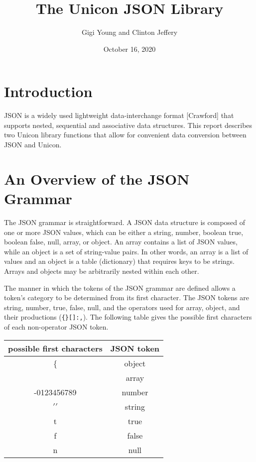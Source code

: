 \documentclass[letterpaper,12pt]{article}
\title{The Unicon JSON Library}
\author{Gigi Young and Clinton Jeffery}
\date{October 16, 2020}
\begin{document}
\maketitle

\section{Introduction}

JSON is a widely used lightweight data-interchange format [Crawford]
that supports nested, sequential and associative data structures.
This report describes two Unicon library
functions that allow for convenient data conversion
between JSON and Unicon.

\section{An Overview of the JSON Grammar}

The JSON grammar is straightforward. A JSON data structure is composed
of one or more JSON values, which can be either a string, number,
boolean true, boolean false, null, array, or object. An array contains
a list of JSON values, while an object is a set of string-value
pairs. In other words, an array is a list of values and an object is a
table (dictionary) that requires keys to be strings.
Arrays and objects may be arbitrarily nested within each other.

The manner in which the tokens of the JSON grammar are defined allows
a token's category to be determined from its first character. The JSON
tokens are string, number, true, false, null, and the operators used
for array, object, and their productions (\texttt{\{\}[]:,}). The
following table gives the possible first characters of each
non-operator JSON token.

\begin{center}
\begin{tabular}{ c | c }
 possible first characters  & JSON token \\
 \hline
 \{                         & object \\
 \verb [                    & array \\
 -0123456789                & number \\
 $\prime\prime$             & string \\
 t                          & true \\
 f                          & false \\
 n                          & null \\

\end{tabular}
\end{center}
\end{document}
